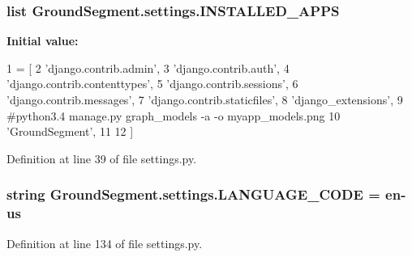 \subsubsection[{I\+N\+S\+T\+A\+L\+L\+E\+D\+\_\+\+A\+P\+P\+S}]{\setlength{\rightskip}{0pt plus 5cm}list Ground\+Segment.\+settings.\+I\+N\+S\+T\+A\+L\+L\+E\+D\+\_\+\+A\+P\+P\+S}\label{namespace_ground_segment_1_1settings_a87e988a27e0909411e0d3111b409f128}
{\bfseries Initial value\+:}
\begin{DoxyCode}
1 = [
2     \textcolor{stringliteral}{'django.contrib.admin'},
3     \textcolor{stringliteral}{'django.contrib.auth'},
4     \textcolor{stringliteral}{'django.contrib.contenttypes'},
5     \textcolor{stringliteral}{'django.contrib.sessions'},
6     \textcolor{stringliteral}{'django.contrib.messages'},
7     \textcolor{stringliteral}{'django.contrib.staticfiles'},
8     \textcolor{stringliteral}{'django\_extensions'},
9     \textcolor{comment}{#python3.4 manage.py graph\_models -a -o myapp\_models.png}
10     \textcolor{stringliteral}{'GroundSegment'},
11     
12 ]
\end{DoxyCode}


Definition at line 39 of file settings.\+py.

\hypertarget{namespace_ground_segment_1_1settings_ad00a75a321dcbd00ef2dc2d0181ea4bb}{}
\subsubsection[{L\+A\+N\+G\+U\+A\+G\+E\+\_\+\+C\+O\+D\+E}]{\setlength{\rightskip}{0pt plus 5cm}string Ground\+Segment.\+settings.\+L\+A\+N\+G\+U\+A\+G\+E\+\_\+\+C\+O\+D\+E = \textquotesingle{}en-\/us\textquotesingle{}}\label{namespace_ground_segment_1_1settings_ad00a75a321dcbd00ef2dc2d0181ea4bb}


Definition at line 134 of file settings.\+py.

\hypertarget{namespace_ground_segment_1_1settings_ac72e34b0dd6d700d555daae97bae8118}{}
